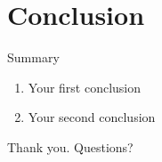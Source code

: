 \documentclass[aspectratio=43]{beamer}
\begin{document}
\section{Conclusion}
\begin{frame}{Summary}
  \begin{enumerate}
    \item Your first conclusion
    \item Your second conclusion
  \end{enumerate}
  \vfill
  \begin{center}
    {\Large Thank you. Questions?}
  \end{center}
\end{frame}
\end{document}
